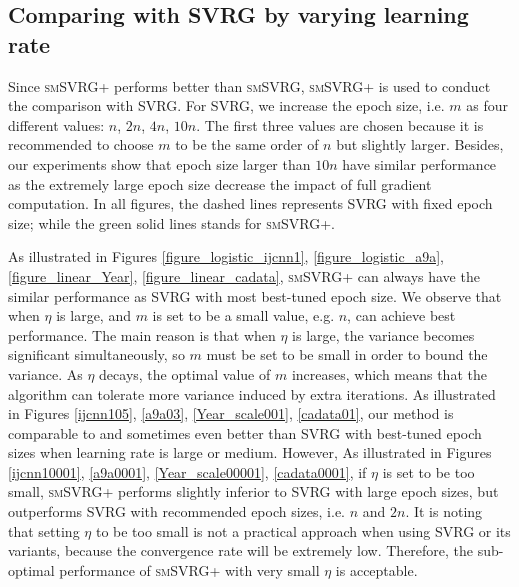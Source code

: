 \documentclass[conference]{IEEEtran}
\begin{document}
 \subsection{Comparing with SVRG by varying learning rate}
Since \textsc{smSVRG+} performs better than \textsc{smSVRG}, \textsc{smSVRG+} is used to conduct the comparison with SVRG. For SVRG, we increase the epoch size, i.e. $m$ as four different values: $n$, $2n$, $4n$, $10n$. The first three values are chosen because it is recommended to choose $m$ to be the same order of $n$ but slightly larger\citep{Johnson:9MAvkbgy}. Besides, our experiments show that epoch size larger than $10n$ have similar performance as the extremely large epoch size decrease the impact of full gradient computation. In all figures, the dashed lines represents SVRG with fixed epoch size; while the green solid lines stands for \textsc{smSVRG+}.

As illustrated in Figures \ref{figure_logistic_ijcnn1}, \ref{figure_logistic_a9a}, \ref{figure_linear_Year}, \ref{figure_linear_cadata},  \textsc{smSVRG+} can always have the similar performance as SVRG with most best-tuned epoch size. We observe that when $\eta$ is large,  and $m$ is set to be a small value, e.g. $n$, can achieve best performance. The main reason is that when $\eta$ is large, the variance becomes significant simultaneously, so $m$ must be set to be small in order to bound the variance. As $\eta$ decays, the optimal value of $m$ increases, which means that the algorithm can tolerate more variance induced by extra iterations. As illustrated in Figures \ref{ijcnn105}, \ref{a9a03}, \ref{Year_scale001}, \ref{cadata01}, our method is comparable to and sometimes even better than SVRG with best-tuned epoch sizes when learning rate is large or medium. However, As illustrated in Figures \ref{ijcnn10001}, \ref{a9a0001}, \ref{Year_scale00001}, \ref{cadata0001}, if $\eta$ is set to be too small, \textsc{smSVRG+} performs slightly inferior to  SVRG with large epoch sizes, but outperforms SVRG with recommended epoch sizes, i.e. $n$ and $2n$. It is noting that setting $\eta$ to be too small is not a practical approach when using SVRG or its variants, because the convergence rate will be extremely low. Therefore, the sub-optimal performance of \textsc{smSVRG+} with very small $\eta$ is acceptable.
 
\end{document}
